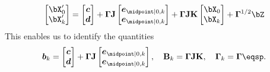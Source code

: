 \begin{equation*}
    \begin{aligned}
       \begin{bmatrix}\bX_0'\\\bX_k'\end{bmatrix}
       =
        \begin{bmatrix}\biaszero\\\biask\end{bmatrix}
        + 
        \mathbf{\Gamma} \mathbf{J} \begin{bmatrix}\pibias_{\midpoint| 0, k} \\ \pibias_{\midpoint| 0, k}\end{bmatrix}
        + 
        \mathbf{\Gamma} \mathbf{J} \mathbf{K} \begin{bmatrix}\bX_0\\\bX_k\end{bmatrix}
        +
        \mathbf{\Gamma}^{1/2} \bZ
    \end{aligned}
\end{equation*}
This enables us to identify the quantities
\begin{equation*}
    \boldsymbol{b}_k = \begin{bmatrix}\biaszero\\\biask\end{bmatrix}
        + 
        \mathbf{\Gamma} \mathbf{J} \begin{bmatrix}\pibias_{\midpoint| 0, k} \\ \pibias_{\midpoint| 0, k}\end{bmatrix},
    \quad
    \mathbf{B}_k = \mathbf{\Gamma} \mathbf{J} \mathbf{K},
    \quad
    \mathbf{\Gamma}_k = \mathbf{\Gamma}
    \eqsp.
\end{equation*}



